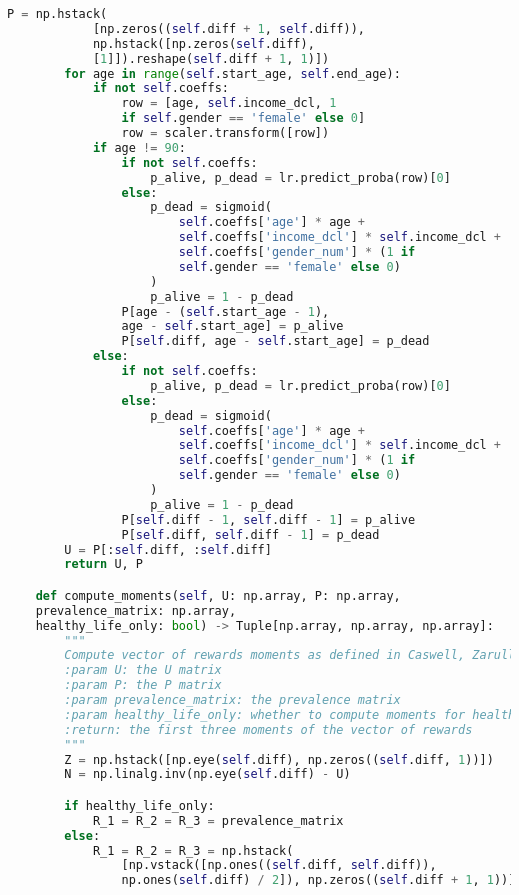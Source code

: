 \begin{lstlisting}[language=Python]
        P = np.hstack(
            [np.zeros((self.diff + 1, self.diff)), 
            np.hstack([np.zeros(self.diff),
            [1]]).reshape(self.diff + 1, 1)])
        for age in range(self.start_age, self.end_age):
            if not self.coeffs:
                row = [age, self.income_dcl, 1 
                if self.gender == 'female' else 0]
                row = scaler.transform([row])
            if age != 90:
                if not self.coeffs:
                    p_alive, p_dead = lr.predict_proba(row)[0]
                else:
                    p_dead = sigmoid(
                        self.coeffs['age'] * age +
                        self.coeffs['income_dcl'] * self.income_dcl +
                        self.coeffs['gender_num'] * (1 if
                        self.gender == 'female' else 0)
                    )
                    p_alive = 1 - p_dead
                P[age - (self.start_age - 1), 
                age - self.start_age] = p_alive
                P[self.diff, age - self.start_age] = p_dead
            else:
                if not self.coeffs:
                    p_alive, p_dead = lr.predict_proba(row)[0]
                else:
                    p_dead = sigmoid(
                        self.coeffs['age'] * age +
                        self.coeffs['income_dcl'] * self.income_dcl +
                        self.coeffs['gender_num'] * (1 if
                        self.gender == 'female' else 0)
                    )
                    p_alive = 1 - p_dead
                P[self.diff - 1, self.diff - 1] = p_alive
                P[self.diff, self.diff - 1] = p_dead
        U = P[:self.diff, :self.diff]
        return U, P

    def compute_moments(self, U: np.array, P: np.array, 
    prevalence_matrix: np.array, 
    healthy_life_only: bool) -> Tuple[np.array, np.array, np.array]:
        """
        Compute vector of rewards moments as defined in Caswell, Zarulli (2018)
        :param U: the U matrix
        :param P: the P matrix
        :param prevalence_matrix: the prevalence matrix
        :param healthy_life_only: whether to compute moments for healthy or total life 
        :return: the first three moments of the vector of rewards
        """
        Z = np.hstack([np.eye(self.diff), np.zeros((self.diff, 1))])
        N = np.linalg.inv(np.eye(self.diff) - U)

        if healthy_life_only:
            R_1 = R_2 = R_3 = prevalence_matrix
        else:
            R_1 = R_2 = R_3 = np.hstack(
                [np.vstack([np.ones((self.diff, self.diff)), 
                np.ones(self.diff) / 2]), np.zeros((self.diff + 1, 1))])


\end{lstlisting}
